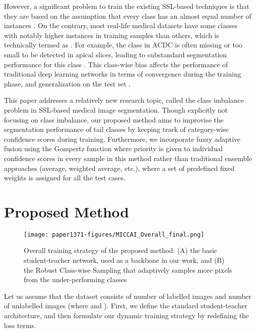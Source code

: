 \documentclass[runningheads]{llncs}
\begin{document}
However, a significant problem to train the existing SSL-based techniques is that they are based on the assumption that every class has an almost equal number of instances \cite{stanescu2014semi}. On the contrary, most real-life medical datasets have some classes with notably higher instances in training samples than others, which is technically termed as  . For example, the class  in ACDC \cite{bernard2018deep} is often missing or too small to be detected in apical slices, leading to substandard segmentation performance for this class \cite{bernard2018deep}.  This class-wise bias affects the performance of traditional deep learning networks in terms of convergence during the training phase, and generalization on the test set \cite{japkowicz2002class}.

This paper addresses a relatively new research topic, called the class imbalance problem in SSL-based medical image segmentation. Though explicitly not focusing on class imbalance, our proposed method aims to improvise the segmentation performance of tail classes by keeping track of category-wise confidence scores during training. Furthermore, we incorporate fuzzy adaptive fusion using the Gompertz function where priority is given to individual confidence scores in every sample in this method rather than traditional ensemble approaches (average, weighted average, etc.), where a set of predefined fixed weights is assigned for all the test cases.






\section{Proposed Method}

\begin{figure}[tbp]
    \centering
    \texttt{[image: paper1371-figures/MICCAI\_Overall\_final.png]}
    \caption{Overall training strategy of the proposed method: (A) the basic student-teacher network, used as a backbone in our work, and (B) the Robust Class-wise Sampling that adaptively samples more pixels from the under-performing classes}
    \label{overall_figure}
\end{figure}

Let us assume that the dataset consists of  number of labelled images  and  number of unlabelled images  (where  and ). First, we define the standard student-teacher architecture, and then formulate our dynamic training strategy by redefining the loss terms. 
\end{document}
